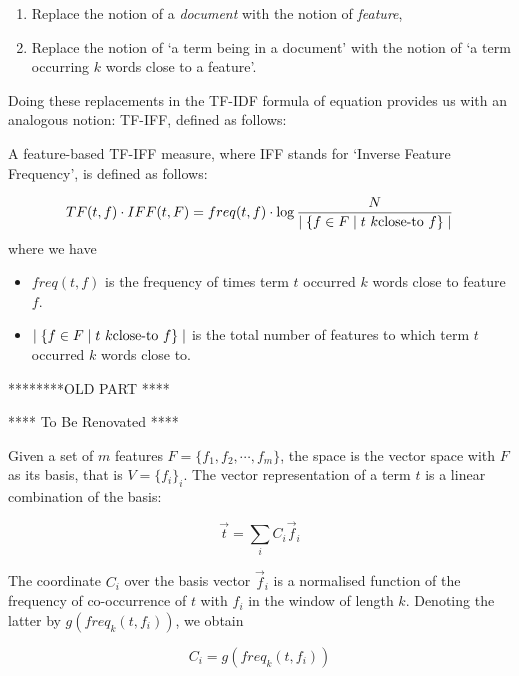 \begin{enumerate}
\item   Replace the notion of a  \emph{document}  with the notion of  \emph{feature}, 
\item  Replace the notion of `a term being in a document'  with the notion of `a term occurring $k$ words close to a feature'.  
\end{enumerate}

Doing these replacements in the TF-IDF formula of equation  \label {tf-idf} provides us with an analogous notion:   TF-IFF, defined as follows:

\begin{definition}
A feature-based TF-IFF  measure, where IFF stands for `Inverse Feature Frequency', is defined as follows:

\begin{equation}
\label{tf-iff}
TF(t,f) \cdot IFF(t, F) = freq(t, f) \cdot \log{{N} \over {\mid \{f \in F \mid t  \ k\textmd{close-to} \ f \} \mid}}
\end{equation}
where we have
\begin{itemize}
\item $freq(t, f)$ is the frequency of times term $t$ occurred $k$ words close to feature $f$.
\item $\mid \{f \in F \mid t  \ k\textmd{close-to} \ f \} \mid$ is the total number of features to which term $t$ occurred $k$ words close to. 
\end{itemize}

\end{definition}


********OLD PART ****

**** To Be Renovated ****

Given a set of $m$ features $F = \{f_1, f_2, \cdots, f_m\}$, the space is the vector space with $F$ as its basis, that is $V = \{f_i\}_i$. The vector representation of a term $t$ is a linear combination of the basis:

\begin{equation}
\label{vector-word}
\overrightarrow{t}  = \sum_i  C_i  \overrightarrow{f}_i
\end{equation}

The coordinate $C_i$ over the basis vector $\overrightarrow{f}_i$ is a normalised function of the frequency of co-occurrence of $t$ with $f_i$ in the window of length $k$. Denoting the latter by  $g(freq_k(t,f_i))$, we obtain 

\begin{equation}
C_i = g(freq_k(t,f_i))
\end{equation}

